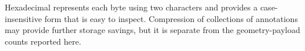\documentclass[%
 preprint,
superscriptaddress,
 amsmath,amssymb,
 aip,
 jcp,
]{revtex4-2}
\begin{document}

Hexadecimal represents each byte using two characters and provides a case-insensitive form that is easy to inspect.
Compression of collections of annotations may provide further storage savings, but it is separate from the geometry-payload counts reported here.
\end{document}
